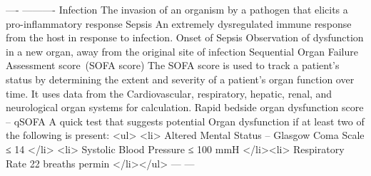 \markdownRendererPipe{}  \markdownRendererPipe{}  \markdownRendererPipe{} \markdownRendererPipe{} ---- \markdownRendererPipe{} ---------- \markdownRendererPipe{} \markdownRendererPipe{} Infection \markdownRendererPipe{} The invasion of an organism by a pathogen that elicits a pro-inflammatory response \markdownRendererPipe{} \markdownRendererPipe{} Sepsis \markdownRendererPipe{} An extremely dysregulated immune response from the host in response to infection. \markdownRendererPipe{} \markdownRendererPipe{} Onset of Sepsis \markdownRendererPipe{} Observation of dysfunction in a new organ, away from the original site of infection \markdownRendererPipe{} \markdownRendererPipe{} Sequential Organ Failure Assessment score (SOFA score) \markdownRendererPipe{} The SOFA score is used to track a patient's status by determining the extent and severity of a patient's organ function over time. It uses data from the Cardiovascular, respiratory, hepatic, renal, and neurological organ systems for calculation. \markdownRendererPipe{} \markdownRendererPipe{} Rapid bedside organ dysfunction score – qSOFA \markdownRendererPipe{} A quick test that suggests potential Organ dysfunction if at least two of the following is present: <ul> <li> Altered Mental Status – Glasgow Coma Scale ≤ 14 </li> <li> Systolic Blood Pressure ≤ 100 mmH </li><li> Respiratory Rate 22 breaths permin </li></ul>\markdownRendererPipe{} \markdownRendererPipe{}---\markdownRendererPipe{} ---\markdownRendererPipe{} \markdownRendererPipe{} \markdownRendererPipe{} \markdownRendererPipe{}\relax